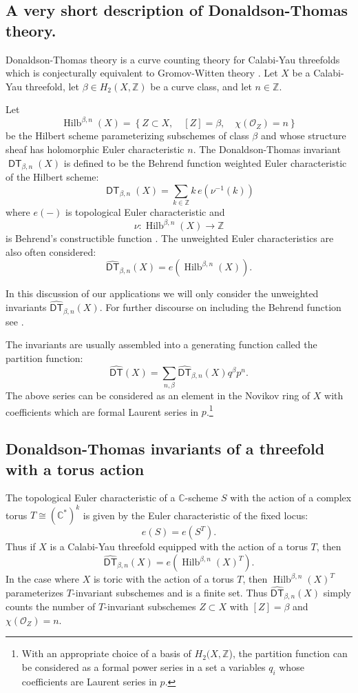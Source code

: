 \documentclass[12pt]{amsart}
\newcommand{\cnums} {{\mathbb C}}          %
\newcommand{\znums} {{\mathbb Z}}		%
\theoremstyle{definition}
\renewcommand{\O}{\mathcal{O}}
\newcommand{\DT}{\operatorname{\mathsf{DT}}}
\newcommand{\DThat}{\operatorname{\widehat{\mathsf{DT}}}}
\newcommand{\HilbBetan}{\operatorname{Hilb}^{\beta ,n}}
\begin{document}
\subsection{A very short description of Donaldson-Thomas theory.}

Donaldson-Thomas theory is a curve counting theory for Calabi-Yau
threefolds which is conjecturally equivalent to Gromov-Witten theory
\cite{MNOP1}. Let $X$ be a Calabi-Yau threefold, let $\beta \in
H_{2}(X,\znums )$ be a curve class, and let $n\in \znums$.

Let
\[
\HilbBetan (X) = \left\{Z\subset X,\quad [Z]=\beta ,\quad \chi (\O_{Z})=n \right\}
\]
be the Hilbert scheme parameterizing subschemes of class $\beta$ and
whose structure sheaf has holomorphic Euler characteristic $n$. The
Donaldson-Thomas invariant $\DT_{\beta ,n}(X)$ is defined to be the
Behrend function weighted Euler characteristic of the Hilbert scheme:
\[
\DT_{\beta ,n} (X)= \sum_{k\in \znums} k\, e\left( \nu^{-1}(k) \right)
\] 
where $e(-)$ is topological Euler characteristic and 
\[
\nu : \HilbBetan (X)\to \znums 
\]
is Behrend's constructible function \cite{Behrend-micro}. The
unweighted Euler characteristics are also often considered:
\[
\DThat_{\beta ,n} (X) = e\left(\HilbBetan (X) \right).
\]

In this discussion of our applications we will only consider the
unweighted invariants $\DThat_{\beta ,n}(X)$. For further discourse on
including the Behrend function see \cite{Bryan-K3xE,Bryan-Kool,BOPY}. 


The invariants are usually assembled into a generating function called
the partition function:
\[
\DThat (X) = \sum_{n,\beta} \DThat_{\beta ,n}(X) q^{\beta} p^{n}.
\]
The above series can be considered as an element in the Novikov
ring of $X$ with coefficients which are formal Laurent series in
$p$.\footnote{With an appropriate choice of a basis of
$H_{2}(X,\znums$), the partition function can be considered as a formal
power series in a set a variables $q_{i}$ whose coefficients are
Laurent series in $p$.}


\subsection{Donaldson-Thomas invariants of a threefold with a torus action}

The topological Euler characteristic of a $\cnums$-scheme $S$ with the
action of a complex torus $T \cong (\cnums^{*})^{k}$ is given by the
Euler characteristic of the fixed locus:
\[
e(S) = e\left(S^{T} \right).
\]
Thus if $X$ is a Calabi-Yau threefold equipped with the action of a
torus $T$, then
\[
\DThat_{\beta ,n}(X) = e\left(\HilbBetan (X)^{T} \right).
\]
In the case where $X$ is toric with the action of a torus $T$, then
$\HilbBetan (X)^{T}$ parameterizes $T$-invariant subschemes and is a
finite set. Thus $\DThat_{\beta ,n}(X)$ simply counts the number of
$T$-invariant subschemes $Z\subset X$ with $[Z]=\beta$ and $\chi
(\O_{Z})=n$.
\end{document}
